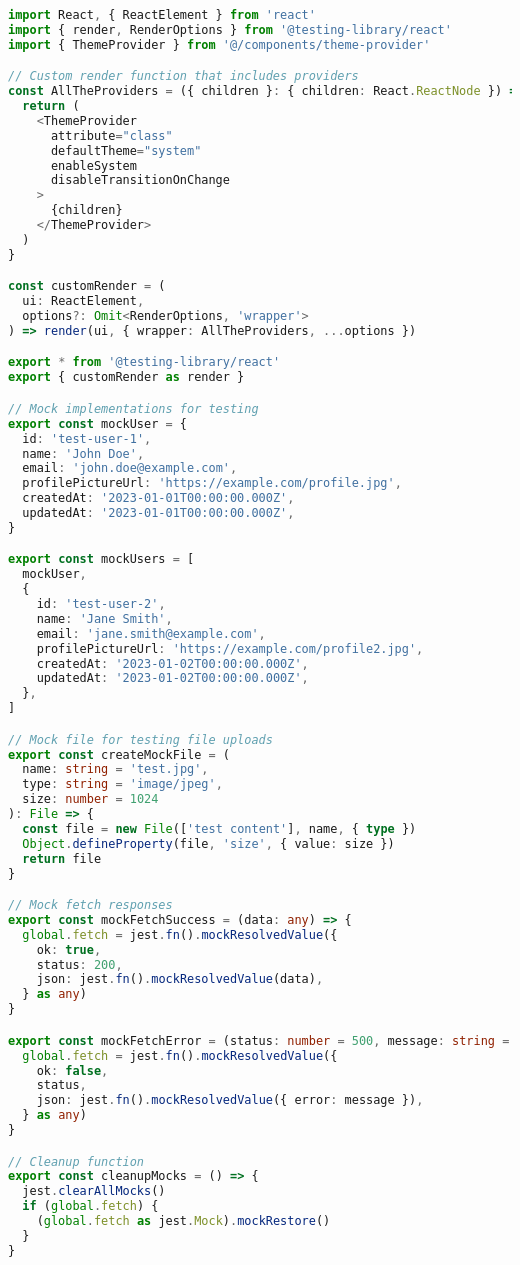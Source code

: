 \begin{lstlisting}[language=TypeScript, caption=__tests__/utils/test-utils.tsx]
import React, { ReactElement } from 'react'
import { render, RenderOptions } from '@testing-library/react'
import { ThemeProvider } from '@/components/theme-provider'

// Custom render function that includes providers
const AllTheProviders = ({ children }: { children: React.ReactNode }) => {
  return (
    <ThemeProvider
      attribute="class"
      defaultTheme="system"
      enableSystem
      disableTransitionOnChange
    >
      {children}
    </ThemeProvider>
  )
}

const customRender = (
  ui: ReactElement,
  options?: Omit<RenderOptions, 'wrapper'>
) => render(ui, { wrapper: AllTheProviders, ...options })

export * from '@testing-library/react'
export { customRender as render }

// Mock implementations for testing
export const mockUser = {
  id: 'test-user-1',
  name: 'John Doe',
  email: 'john.doe@example.com',
  profilePictureUrl: 'https://example.com/profile.jpg',
  createdAt: '2023-01-01T00:00:00.000Z',
  updatedAt: '2023-01-01T00:00:00.000Z',
}

export const mockUsers = [
  mockUser,
  {
    id: 'test-user-2',
    name: 'Jane Smith',
    email: 'jane.smith@example.com',
    profilePictureUrl: 'https://example.com/profile2.jpg',
    createdAt: '2023-01-02T00:00:00.000Z',
    updatedAt: '2023-01-02T00:00:00.000Z',
  },
]

// Mock file for testing file uploads
export const createMockFile = (
  name: string = 'test.jpg',
  type: string = 'image/jpeg',
  size: number = 1024
): File => {
  const file = new File(['test content'], name, { type })
  Object.defineProperty(file, 'size', { value: size })
  return file
}

// Mock fetch responses
export const mockFetchSuccess = (data: any) => {
  global.fetch = jest.fn().mockResolvedValue({
    ok: true,
    status: 200,
    json: jest.fn().mockResolvedValue(data),
  } as any)
}

export const mockFetchError = (status: number = 500, message: string = 'Internal Server Error') => {
  global.fetch = jest.fn().mockResolvedValue({
    ok: false,
    status,
    json: jest.fn().mockResolvedValue({ error: message }),
  } as any)
}

// Cleanup function
export const cleanupMocks = () => {
  jest.clearAllMocks()
  if (global.fetch) {
    (global.fetch as jest.Mock).mockRestore()
  }
}
\end{lstlisting}

